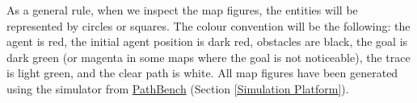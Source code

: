As a general rule, when we inspect the map figures, the entities will be represented by circles or squares. The colour convention will be the following: the agent is red, the initial agent position is dark red, obstacles are black, the goal is dark green (or magenta in some maps where the goal is not noticeable), the trace is light green, and the clear path is white. All map figures have been generated using the simulator from \hyperref[Simulation Platform]{PathBench} (Section \ref{Simulation Platform}).




